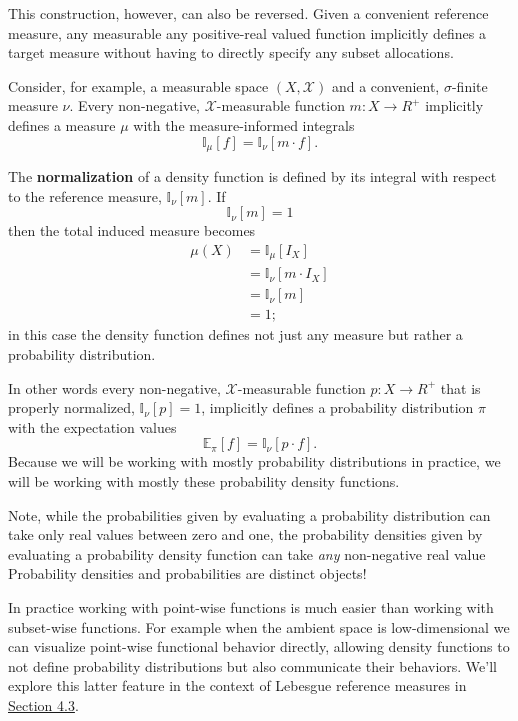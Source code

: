 \documentclass[
  letterpaper,
  DIV=11,
  numbers=noendperiod]{scrartcl}
\begin{document}
This construction, however, can also be reversed. Given a convenient
reference measure, any measurable any positive-real valued function
implicitly defines a target measure without having to directly specify
any subset allocations.

Consider, for example, a measurable space \((X, \mathcal{X})\) and a
convenient, \(\sigma\)-finite measure \(\nu\). Every non-negative,
\(\mathcal{X}\)-measurable function \(m : X \rightarrow R^{+}\)
implicitly defines a measure \(\mu\) with the measure-informed integrals
\[
\mathbb{I}_{\mu}[f] = \mathbb{I}_{\nu} \left[ m \cdot f \right].
\]

The \textbf{normalization} of a density function is defined by its
integral with respect to the reference measure,
\(\mathbb{I}_{\nu}[ m ]\). If \[
\mathbb{I}_{\nu}[ m ] = 1
\] then the total induced measure becomes \begin{align*}
\mu(X)
&=
\mathbb{I}_{\mu}[I_{X}]
\\
&=
\mathbb{I}_{\nu} [ m \cdot I_{X} ]
\\
&=
\mathbb{I}_{\nu} [ m ]
\\
&=
1;
\end{align*} in this case the density function defines not just any
measure but rather a probability distribution.

In other words every non-negative, \(\mathcal{X}\)-measurable function
\(p : X \rightarrow R^{+}\) that is properly normalized,
\(\mathbb{I}_{\nu} [ p ] = 1\), implicitly defines a probability
distribution \(\pi\) with the expectation values \[
\mathbb{E}_{\pi}[f] = \mathbb{I}_{\nu} \left[ p \cdot f \right].
\] Because we will be working with mostly probability distributions in
practice, we will be working with mostly these probability density
functions.

Note, while the probabilities given by evaluating a probability
distribution can take only real values between zero and one, the
probability densities given by evaluating a probability density function
can take \emph{any} non-negative real value Probability densities and
probabilities are distinct objects!

In practice working with point-wise functions is much easier than
working with subset-wise functions. For example when the ambient space
is low-dimensional we can visualize point-wise functional behavior
directly, allowing density functions to not define probability
distributions but also communicate their behaviors. We'll explore this
latter feature in the context of Lebesgue reference measures in
\href{@sec:visualizing}{Section 4.3}.
\end{document}
